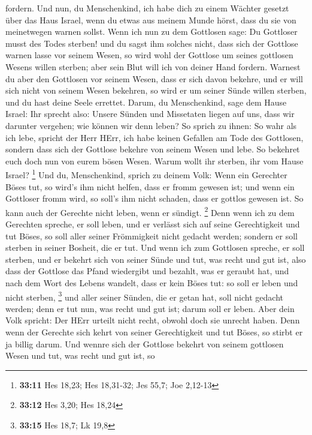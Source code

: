 fordern.  Und nun, du Menschenkind, ich habe dich zu einem
Wächter gesetzt über das Haus Israel, wenn du etwas aus meinem Munde
hörst, dass du sie von meinetwegen warnen sollst.  Wenn ich
nun zu dem Gottlosen sage: Du Gottloser musst des Todes sterben! und du
sagst ihm solches nicht, dass sich der Gottlose warnen lasse vor seinem
Wesen, so wird wohl der Gottlose um seines gottlosen Wesens willen
sterben; aber sein Blut will ich von deiner Hand fordern. 
Warnest du aber den Gottlosen vor seinem Wesen, dass er sich davon
bekehre, und er will sich nicht von seinem Wesen bekehren, so wird er um
seiner Sünde willen sterben, und du hast deine Seele errettet.
 Darum, du Menschenkind, sage dem Hause Israel: Ihr sprecht
also: Unsere Sünden und Missetaten liegen auf uns, dass wir darunter
vergehen; wie können wir denn leben?  So sprich zu ihnen:
So wahr als ich lebe, spricht der Herr HErr, ich habe keinen Gefallen am
Tode des Gottlosen, sondern dass sich der Gottlose bekehre von seinem
Wesen und lebe. So bekehret euch doch nun von eurem bösen Wesen. Warum
wollt ihr sterben, ihr vom Hause Israel? \footnote{\textbf{33:11} Hes
  18,23; Hes 18,31-32; Jes 55,7; Joe 2,12-13}  Und du,
Menschenkind, sprich zu deinem Volk: Wenn ein Gerechter Böses tut, so
wird's ihm nicht helfen, dass er fromm gewesen ist; und wenn ein
Gottloser fromm wird, so soll's ihm nicht schaden, dass er gottlos
gewesen ist. So kann auch der Gerechte nicht leben, wenn er sündigt.
\footnote{\textbf{33:12} Hes 3,20; Hes 18,24}  Denn wenn
ich zu dem Gerechten spreche, er soll leben, und er verlässt sich auf
seine Gerechtigkeit und tut Böses, so soll aller seiner Frömmigkeit
nicht gedacht werden; sondern er soll sterben in seiner Bosheit, die er
tut.  Und wenn ich zum Gottlosen spreche, er soll sterben,
und er bekehrt sich von seiner Sünde und tut, was recht und gut ist,
 also dass der Gottlose das Pfand wiedergibt und bezahlt,
was er geraubt hat, und nach dem Wort des Lebens wandelt, dass er kein
Böses tut: so soll er leben und nicht sterben, \footnote{\textbf{33:15}
  Hes 18,7; Lk 19,8}  und aller seiner Sünden, die er getan
hat, soll nicht gedacht werden; denn er tut nun, was recht und gut ist;
darum soll er leben.  Aber dein Volk spricht: Der HErr
urteilt nicht recht, obwohl doch sie unrecht haben.  Denn
wenn der Gerechte sich kehrt von seiner Gerechtigkeit und tut Böses, so
stirbt er ja billig darum.  Und wennre sich der Gottlose
bekehrt von seinem gottlosen Wesen und tut, was recht und gut ist, so
